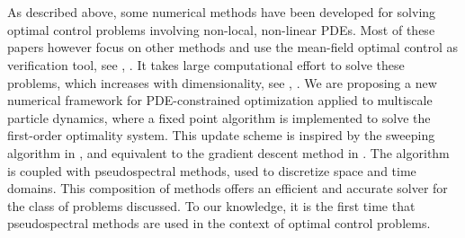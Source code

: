 \\
\\
As described above, some numerical methods have been developed for solving optimal control problems involving non-local, non-linear PDEs. Most of these papers however focus on other methods and use the mean-field optimal control as verification tool, see \cite{Pinnau_2017}, \cite{albi2016mean}. It takes large computational effort to solve these problems, which increases with dimensionality, see \cite{burger2019instantaneous}, \cite{burger2016controlling}. 
We are proposing a new numerical framework for PDE-constrained optimization applied to multiscale particle dynamics, where a fixed point algorithm is implemented to solve the first-order optimality system. This update scheme is inspired by the sweeping algorithm in \cite{albi2016mean}, and equivalent to the gradient descent method in \cite{Burger1}. The algorithm is coupled with pseudospectral methods, used to discretize space and time domains. This composition of methods offers an efficient and accurate solver for the class of problems discussed. To our knowledge, it is the first time that pseudospectral methods are used in the context of optimal control problems.









